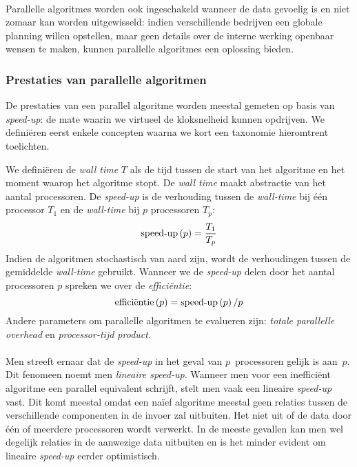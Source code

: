 \paragraph{}
Parallelle algoritmes worden ook ingeschakeld wanneer de data gevoelig is en niet zomaar kan worden uitgewisseld: indien verschillende bedrijven een globale planning willen opstellen, maar geen details over de interne werking openbaar wensen te maken, kunnen parallelle algoritmes een oplossing bieden\cite{Gaspero_amultiagent}.

\subsubsection{Prestaties van parallelle algoritmen}

De prestaties van een parallel algoritme worden meestal gemeten op basis van \emph{speed-up}: de mate waarin we virtueel de kloksnelheid kunnen opdrijven. We defini\"eren eerst enkele concepten waarna we kort een taxonomie hieromtrent toelichten.

\begin{definition}
We defini\"eren de \emph{wall time} $T$ als de tijd tussen de start van het algoritme en het moment waarop het algoritme stopt. De \emph{wall time} maakt abstractie van het aantal processoren. De \emph{speed-up} is de verhouding tussen de \emph{wall-time} bij \'e\'en processor $T_1$ en de \emph{wall-time} bij $p$ processoren $T_p$:
\begin{equation}
\mbox{speed-up}\left(p\right)=\displaystyle\frac{T_1}{T_p}
\end{equation}
Indien de algoritmen stochastisch van aard zijn, wordt de verhoudingen tussen de gemiddelde \emph{wall-time} gebruikt.
Wanneer we de \emph{speed-up} delen door het aantal processoren $p$ spreken we over de \emph{effici\"entie}:
\begin{equation}
\mbox{effici\"entie}\left(p\right)=\mbox{speed-up}\left(p\right)/p
\end{equation}
Andere parameters om parallelle algoritmen te evalueren zijn: \emph{totale parallelle overhead} en \emph{processor-tijd product}\cite{books/bc/KumarGGK94}.
\end{definition}

\paragraph{}
Men streeft ernaar dat de \emph{speed-up} in het geval van $p$~processoren gelijk is aan~$p$. Dit fenomeen noemt men \emph{lineaire speed-up}. Wanneer men voor een ineffici\"ent algoritme een parallel equivalent schrijft, stelt men vaak een lineaire \emph{speed-up} vast. Dit komt meestal omdat een na\"ief algoritme meestal geen relaties tussen de verschillende componenten in de invoer zal uitbuiten. Het niet uit of de data door \'e\'en of meerdere processoren wordt verwerkt. In de meeste gevallen kan men wel degelijk relaties in de aanwezige data uitbuiten en is het minder evident om lineaire \emph{speed-up} eerder optimistisch.

